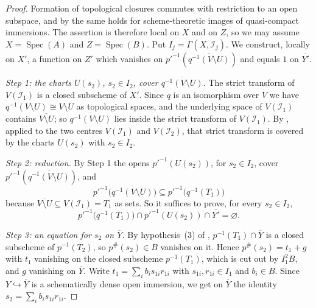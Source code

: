 \begin{proof}
  \leanok
  Formation of topological closures commutes with restriction to an open
  subspace, and by  the same
  holds for scheme-theoretic images of quasi-compact immersions.  The
  assertion is therefore local on $X$ and on $Z$, so we may assume
  $X=\operatorname{Spec}(A)$ and $Z=\operatorname{Spec}(B)$.  Put
  $I_j=\Gamma(X,\mathcal I_j)$.  We construct, locally on $X'$, a function on
  $Z'$ which vanishes on $p'^{-1}(\overline{q^{-1}(V\setminus U)})$ and equals
  $1$ on $\overline{Y'}$.

  \emph{Step 1: the charts $U(s_2)$, $s_2\in I_2$, cover
  $\overline{q^{-1}(V\setminus U)}$.}  The strict transform of $V(\mathcal I_1)$
  is a closed subscheme of $X'$.  Since $q$ is an isomorphism over $V$ we have
  $q^{-1}(V\setminus U)\cong V\setminus U$ as topological spaces, and the
  underlying space of $V(\mathcal I_1)$ contains $\overline{V\setminus U}$; so
  $\overline{q^{-1}(V\setminus U)}$ lies inside the strict transform of
  $V(\mathcal I_1)$.  By
  , applied to the two
  centres $V(\mathcal I_1)$ and $V(\mathcal I_2)$, that strict transform is
  covered by the charts $U(s_2)$ with $s_2\in I_2$.

  \emph{Step 2: reduction.}  By Step 1 the opens $p'^{-1}(U(s_2))$, for
  $s_2\in I_2$, cover $p'^{-1}(\overline{q^{-1}(V\setminus U)})$, and
  \[
    p'^{-1}\bigl(\overline{q^{-1}(V\setminus U)}\bigr)
      \subseteq p'^{-1}\bigl(q^{-1}(T_1)\bigr)
  \]
  because $\overline{V\setminus U}\subseteq V(\mathcal I_1)=T_1$ as sets.  So
  it suffices to prove, for every $s_2\in I_2$,
  \begin{equation}
    \label{eq:nagata-conrad-disjointness-local}
    p'^{-1}\bigl(q^{-1}(T_1)\bigr)\cap p'^{-1}(U(s_2))\cap\overline{Y'}
      =\varnothing .
  \end{equation}

  \emph{Step 3: an equation for $s_2$ on $\overline Y$.}  By hypothesis~(3) of
  , $p^{-1}(T_1)\cap\overline Y$ is
  a closed subscheme of $p^{-1}(T_2)$, so $p^{\#}(s_2)\in B$ vanishes on it.
  Hence $p^{\#}(s_2)=t_1+g$ with $t_1$ vanishing on the closed subscheme
  $p^{-1}(T_1)$, which is cut out by $I_1^2B$, and $g$ vanishing on
  $\overline Y$.  Write $t_1=\sum_ib_is_{1i}r_{1i}$ with $s_{1i},r_{1i}\in I_1$
  and $b_i\in B$.  Since $Y\hookrightarrow\overline Y$ is a schematically dense
  open immersion, we get on $\overline Y$ the identity
  $s_2=\sum_ib_is_{1i}r_{1i}$.


\end{proof}
